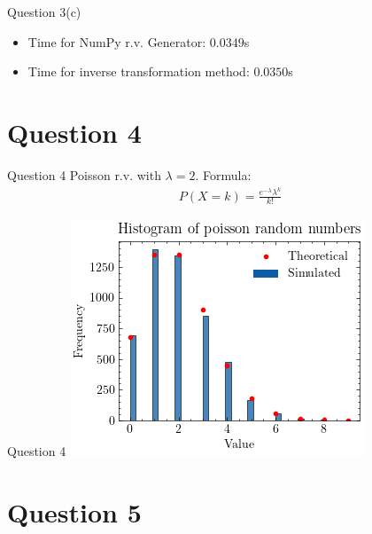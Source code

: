 \documentclass[compress,12pt]{beamer}
\begin{document}
\begin{frame}{Question 3(c)}
     \begin{itemize}
         \item Time for NumPy r.v. Generator: {\color{red}$0.0349$}s
         \item Time for inverse transformation method: {\color{red}$0.0350$}s
     \end{itemize} 
\end{frame}

\section{Question 4}
\begin{frame}{Question 4}
Poisson r.v. with $\lambda = 2$.
Formula:
\begin{align*}
    P(X = k) = \frac{e^{-\lambda} \lambda^k}{k!}
\end{align*}
\end{frame}
\begin{frame}{Question 4}
\centering
\includegraphics[scale=0.7]{imgs/poissonrv.png} 
\end{frame}

\section{Question 5}
\end{document}
